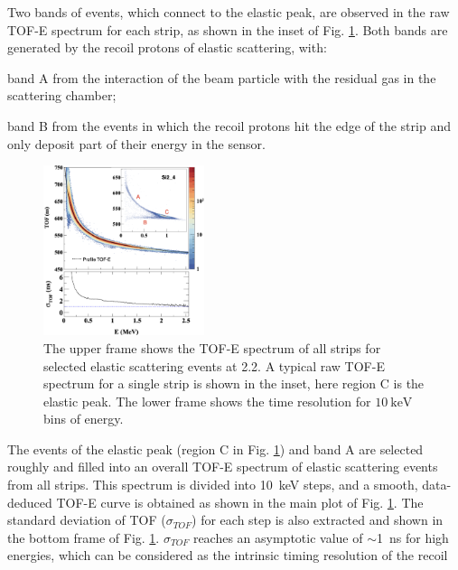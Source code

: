 \documentclass[number,5p]{elsarticle}
\begin{document}
Two bands of events, which connect to the elastic peak, are observed in the raw TOF-E spectrum for each strip, as shown in the inset of Fig. \ref{fig:tof-e}.
Both bands are generated by the recoil protons of elastic scattering, with:
\begin{enumerate*}[label=(\roman*)]
\item band A from the interaction of the beam particle with the residual gas in the scattering chamber;
\item band B from the events in which the recoil protons hit the edge of the strip and only deposit part of their energy in the sensor.
\end{enumerate*}
\begin{figure}[tb!]
  \centering
  \includegraphics[width=0.42\textwidth]{./tofe_tsigma.png}
  \caption{
    The upper frame shows the TOF-E spectrum of all strips for selected elastic
    scattering events at \SI{2.2}{\momentum}.
    A typical raw TOF-E spectrum for a single strip is shown in the inset, here region C is the elastic peak.
    The lower frame shows the time resolution for $\SI{10}{\keV}$ bins of energy.
    }
  \label{fig:tof-e}
\end{figure}
The events of the elastic peak (region C in Fig. \ref{fig:tof-e}) and band A are selected roughly and filled into an overall TOF-E spectrum of elastic scattering events from all strips.
This spectrum is divided into \SI{10}{\keV} steps,  and a smooth, data-deduced TOF-E curve is obtained as shown in the main plot of Fig. \ref{fig:tof-e}.
The standard deviation of TOF ($\sigma_{TOF}$) for each step is also extracted and shown in the bottom frame of Fig. \ref{fig:tof-e}.
$\sigma_{TOF}$ reaches an asymptotic value of $\sim$\SI{1}{\ns} for high energies, which can be considered as the intrinsic timing resolution of the recoil
\end{document}
